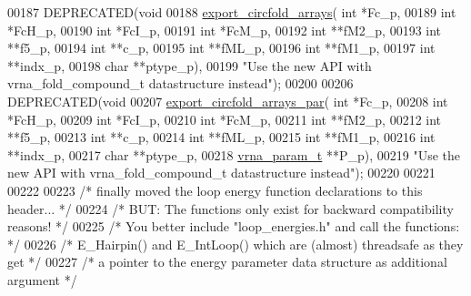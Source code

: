 \begin{DoxyCode}
00187 DEPRECATED(\textcolor{keywordtype}{void}
00188 \hyperlink{group__mfe__global__deprecated_ga04d5d639fd4473ca766436a9bae5665c}{export\_circfold\_arrays}( \textcolor{keywordtype}{int} *Fc\_p,
00189                         \textcolor{keywordtype}{int} *FcH\_p,
00190                         \textcolor{keywordtype}{int} *FcI\_p,
00191                         \textcolor{keywordtype}{int} *FcM\_p,
00192                         \textcolor{keywordtype}{int} **fM2\_p,
00193                         \textcolor{keywordtype}{int} **f5\_p,
00194                         \textcolor{keywordtype}{int} **c\_p,
00195                         \textcolor{keywordtype}{int} **fML\_p,
00196                         \textcolor{keywordtype}{int} **fM1\_p,
00197                         \textcolor{keywordtype}{int} **indx\_p,
00198                         \textcolor{keywordtype}{char} **ptype\_p),
00199 \textcolor{stringliteral}{"Use the new API with vrna\_fold\_compound\_t datastructure instead"});
00200 
00206 DEPRECATED(\textcolor{keywordtype}{void}
00207 \hyperlink{group__mfe__global__deprecated_ga004bb901e7fd2f8d5ae68f9530318ce1}{export\_circfold\_arrays\_par}( \textcolor{keywordtype}{int} *Fc\_p,
00208                             \textcolor{keywordtype}{int} *FcH\_p,
00209                             \textcolor{keywordtype}{int} *FcI\_p,
00210                             \textcolor{keywordtype}{int} *FcM\_p,
00211                             \textcolor{keywordtype}{int} **fM2\_p,
00212                             \textcolor{keywordtype}{int} **f5\_p,
00213                             \textcolor{keywordtype}{int} **c\_p,
00214                             \textcolor{keywordtype}{int} **fML\_p,
00215                             \textcolor{keywordtype}{int} **fM1\_p,
00216                             \textcolor{keywordtype}{int} **indx\_p,
00217                             \textcolor{keywordtype}{char} **ptype\_p,
00218                             \hyperlink{group__energy__parameters_structvrna__param__s}{vrna\_param\_t} **P\_p),
00219 \textcolor{stringliteral}{"Use the new API with vrna\_fold\_compound\_t datastructure instead"});
00220 
00221 
00222 
00223 \textcolor{comment}{/* finally moved the loop energy function declarations to this header...  */}
00224 \textcolor{comment}{/* BUT: The functions only exist for backward compatibility reasons!      */}
00225 \textcolor{comment}{/* You better include "loop\_energies.h" and call the functions:           */}
00226 \textcolor{comment}{/* E\_Hairpin() and E\_IntLoop() which are (almost) threadsafe as they get  */}
00227 \textcolor{comment}{/* a pointer to the energy parameter data structure as additional argument */}

\end{DoxyCode}
